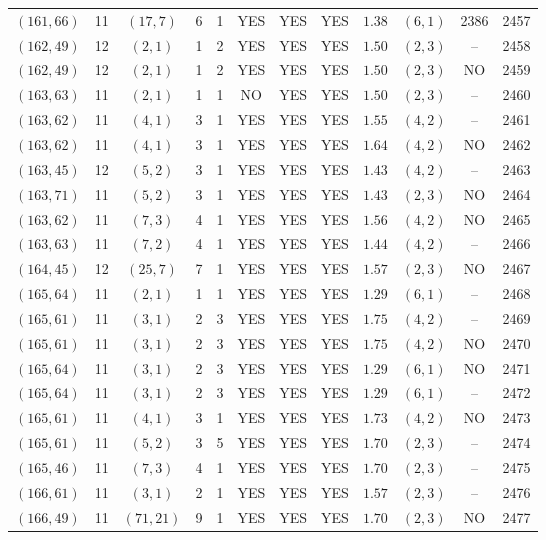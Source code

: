 \begin{longtable}{|c|c|c|c|c|c|c|c|c|c|c|c|}
$(161,66)$ & 11 & $(17,7)$ & 6 & 1 & YES & YES & YES & $1.38$ & $(6,1)$ & 2386 & 2457\\
$(162,49)$ & 12 & $(2,1)$ & 1 & 2 & YES & YES & YES & $1.50$ & $(2,3)$ & -- & 2458\\
$(162,49)$ & 12 & $(2,1)$ & 1 & 2 & YES & YES & YES & $1.50$ & $(2,3)$ & NO & 2459\\
$(163,63)$ & 11 & $(2,1)$ & 1 & 1 & NO & YES & YES & $1.50$ & $(2,3)$ & -- & 2460\\
$(163,62)$ & 11 & $(4,1)$ & 3 & 1 & YES & YES & YES & $1.55$ & $(4,2)$ & -- & 2461\\
$(163,62)$ & 11 & $(4,1)$ & 3 & 1 & YES & YES & YES & $1.64$ & $(4,2)$ & NO & 2462\\
$(163,45)$ & 12 & $(5,2)$ & 3 & 1 & YES & YES & YES & $1.43$ & $(4,2)$ & -- & 2463\\
$(163,71)$ & 11 & $(5,2)$ & 3 & 1 & YES & YES & YES & $1.43$ & $(2,3)$ & NO & 2464\\
$(163,62)$ & 11 & $(7,3)$ & 4 & 1 & YES & YES & YES & $1.56$ & $(4,2)$ & NO & 2465\\
$(163,63)$ & 11 & $(7,2)$ & 4 & 1 & YES & YES & YES & $1.44$ & $(4,2)$ & -- & 2466\\
$(164,45)$ & 12 & $(25,7)$ & 7 & 1 & YES & YES & YES & $1.57$ & $(2,3)$ & NO & 2467\\
$(165,64)$ & 11 & $(2,1)$ & 1 & 1 & YES & YES & YES & $1.29$ & $(6,1)$ & -- & 2468\\
$(165,61)$ & 11 & $(3,1)$ & 2 & 3 & YES & YES & YES & $1.75$ & $(4,2)$ & -- & 2469\\
$(165,61)$ & 11 & $(3,1)$ & 2 & 3 & YES & YES & YES & $1.75$ & $(4,2)$ & NO & 2470\\
$(165,64)$ & 11 & $(3,1)$ & 2 & 3 & YES & YES & YES & $1.29$ & $(6,1)$ & NO & 2471\\
$(165,64)$ & 11 & $(3,1)$ & 2 & 3 & YES & YES & YES & $1.29$ & $(6,1)$ & -- & 2472\\
$(165,61)$ & 11 & $(4,1)$ & 3 & 1 & YES & YES & YES & $1.73$ & $(4,2)$ & NO & 2473\\
$(165,61)$ & 11 & $(5,2)$ & 3 & 5 & YES & YES & YES & $1.70$ & $(2,3)$ & -- & 2474\\
$(165,46)$ & 11 & $(7,3)$ & 4 & 1 & YES & YES & YES & $1.70$ & $(2,3)$ & -- & 2475\\
$(166,61)$ & 11 & $(3,1)$ & 2 & 1 & YES & YES & YES & $1.57$ & $(2,3)$ & -- & 2476\\
$(166,49)$ & 11 & $(71,21)$ & 9 & 1 & YES & YES & YES & $1.70$ & $(2,3)$ & NO & 2477\\

\end{longtable}

